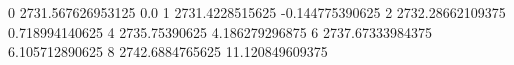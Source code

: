 0 2731.567626953125 0.0
1 2731.4228515625 -0.144775390625
2 2732.28662109375 0.718994140625
4 2735.75390625 4.186279296875
6 2737.67333984375 6.105712890625
8 2742.6884765625 11.120849609375
